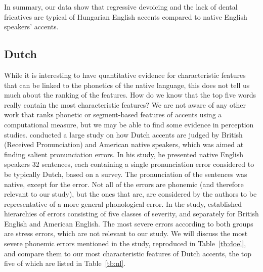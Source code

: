 \documentclass[output=paper]{LSP/langsci}
\begin{document}
In summary, our data show that regressive devoicing and the lack of dental fricatives are typical of Hungarian English accents compared to native English speakers' accents.

\subsection{Dutch}


While it is interesting to have quantitative evidence for characteristic features that can be linked to the phonetics of the native language, this does not tell us much about the ranking of the features. How do we know that the top five words really contain the most characteristic features? We are not aware of any other work that ranks phonetic or segment-based features of accents using a computational measure, but we may be able to find some evidence in perception studies. \citet{van_den_doel_evaluation_2006} conducted a large study on how Dutch accents are judged by British (Received Pronunciation) and American native speakers, which was aimed at finding salient pronunciation errors. In his study, he presented native English speakers 32 sentences, each containing a single pronunciation error considered to be typically Dutch, based on a survey. The pronunciation of the sentences was native, except for the error. Not all of the errors are phonemic (and therefore relevant to our study), but the ones that are, are considered by the authors to be representative of a more general phonological error. In the study, \citet[292]{van_den_doel_evaluation_2006} established hierarchies of errors consisting of five classes of severity, and separately for British English and American English. The most severe errors according to both groups are stress errors, which are not relevant to our study. We will discuss the most severe phonemic errors mentioned in the study, reproduced in Table~\ref{tb:doel}, and compare them to our most characteristic features of Dutch accents, the top five of which are listed in Table~\ref{tb:nl}.
\end{document}
